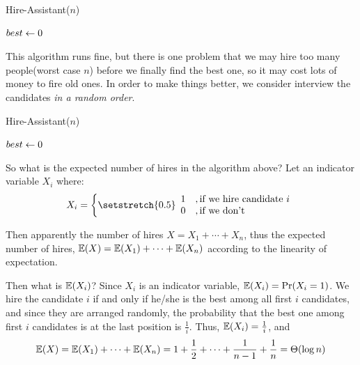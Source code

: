 \begin{spacing}{1.3}
    \begin{algorithm*}[H]
        \caption{Hire-Assistant($n$)}

        $best\leftarrow 0$

    \end{algorithm*}

    This algorithm runs fine, but there is one problem that we 
    may hire too many people(worst case $n$) 
    before we finally find the best one,
    so it may cost lots of money to fire old ones.
    In order to make things better, we consider interview the 
    candidates {\it in a random order}.

    \begin{algorithm*}[H]
        \caption{Hire-Assistant($n$)}

        {}

        $best\leftarrow 0$

    \end{algorithm*}

    So what is the expected number of hires in the algorithm above?
    Let an indicator variable $X_i$ where: 
    $$X_i=\left\{ 
        \setstretch{0.5}
        \begin{array}{ll}
            1 &, \text{if we hire candidate }i\\
            0 &, \text{if we don't}
        \end{array}
     \right.$$
    
    Then apparently the number of hires $X=X_1+\cdots+X_n$, thus 
    the expected number of hires, $\mathbb{E}(X)=\mathbb{E}(X_1)+\cdots+\mathbb{E}(X_n)$ 
    according to the linearity of expectation.

    Then what is $\mathbb{E}(X_i)$? Since $X_i$ is an indicator variable, 
    $\mathbb{E}(X_i)=\Pr(X_i=1)$. We hire the candidate $i$ if and only 
    if he/she is the best among all first $i$ candidates, and 
    since they are arranged randomly, the probability that the best 
    one among first $i$ candidates is at the last position is $\frac{1}{i}$.
    Thus, $\mathbb{E}(X_i)=\frac{1}{i}$, and 
    $$\mathbb{E}(X)=\mathbb{E}(X_1)+\cdots+\mathbb{E}(X_n)=1+\frac{1}{2}+\cdots+\frac{1}{n-1}+\frac{1}{n}
    =\Theta(\log n)$$


\end{spacing}
